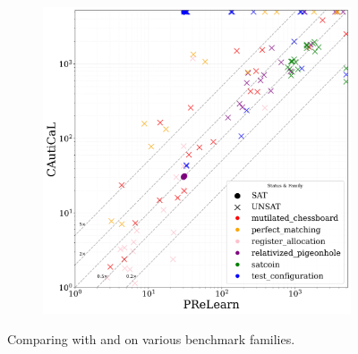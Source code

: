 \begin{figure}[!t]
\begin{subfigure}[t]{0.45\textwidth}
        \includegraphics[width=\textwidth]{figs/prelearn_vs_cautical_interesting_legend.jpg}
        \label{fig:cautical-vs-prelearn}
    \end{subfigure}

    \caption{Comparing \tool with \cadical and \prelearn on various benchmark families.}
    \label{fig:solver-comparison-familis}
\end{figure}












